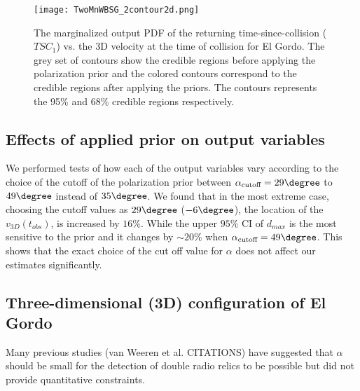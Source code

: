 \begin{figure}
	\texttt{[image: TwoMnWBSG\_2contour2d.png]}
	\caption{The marginalized output PDF of the returning time-since-collision
($TSC_1$) vs. the 3D velocity at the time of collision for El Gordo. The
grey set of contours show the credible regions before applying the
polarization prior and the colored contours correspond to the credible
regions after applying the priors. The contours represents the 95\% and
68\% credible regions respectively. }
	\label{fig:TSC_v3D}
\end{figure}


\subsection{Effects of applied prior on output variables}
%
\label{sec: sensitivityTests}
We performed tests of how each of the output variables vary according to the
choice of the cutoff of the polarization prior between
$\alpha_{\text{cutoff}} =
29 \degree$ to $49\degree$ instead of $35 \degree$.  
We found that in the most extreme case, choosing the cutoff values as $29
\degree$ ($-6 \degree$), the location of the $v_{3D}(t_{obs})$, is
increased by $ 16 \%$. While the upper $95\%$ CI of $d_{max}$ is
the most sensitive to the prior and it changes by
$\sim 20 \%$ when $\alpha_{\text{cutoff}} = 49 \degree$. 
This shows that the exact choice of the cut off value for $\alpha$ does
not affect our estimates significantly.



\subsection{Three-dimensional (3D) configuration of El Gordo}
%

Many previous studies (van Weeren et al. CITATIONS) have suggested that
$\alpha$ should be small for the detection of double radio relics to be
possible but did not provide quantitative constraints.    

